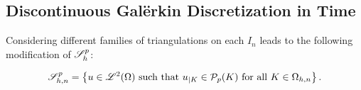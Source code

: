 \newpage
\subsection{Discontinuous Galërkin Discretization in Time}

Considering different families of triangulations on each $I_n$ leads to the following modification of $\mathscr{S}_h^p$:
\begin{definition}[$\SpaceSolution_{h, n}^p$]
    \begin{gather}
        \mathscr{S}_{h, n}^p = \left\{ u \in \mathscr{L}^{2}(\Omega) \text{ such that } u_{\mid K} \in \mathcal{P}_{p}(K) \text{ for all } K \in \Omega_{h, n} \right\}.
    \end{gather}
\end{definition}

